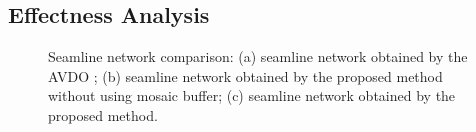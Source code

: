 \documentclass[journal]{IEEEtran}
\begin{document}
\subsection{Effectness Analysis}
\begin{figure}[!t]
	\centering
	\caption{Seamline network comparison: (a) seamline network obtained by the AVDO \cite{Pan2009}; (b) seamline network obtained by the proposed method without using mosaic buffer; (c) seamline network obtained by the proposed method.}
	\label{fig:mosaic-overall-performance}
\end{figure}
\end{document}
